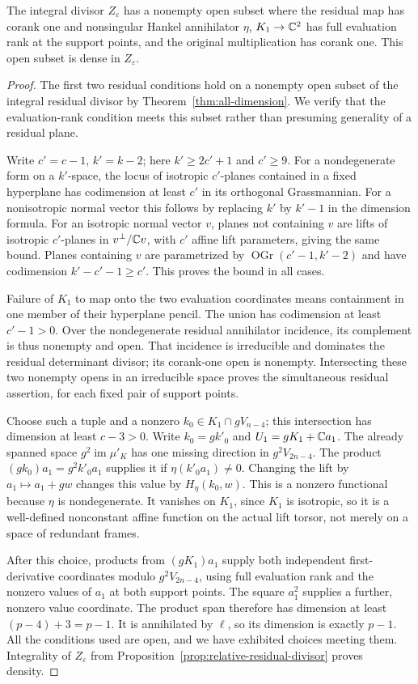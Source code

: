 \begin{lemma}
\label{lem:wall-open-nonempty}
The integral divisor $Z_\varepsilon$ has a nonempty open subset where
the residual map has corank one and nonsingular Hankel annihilator
$\eta$, $K_1\to\mathbb C^2$ has full evaluation rank at the support points,
and the original multiplication has corank one. This open subset is
dense in $Z_\varepsilon$.
\end{lemma}
\begin{proof}
The first two residual conditions hold on a nonempty open subset of
the integral residual divisor by Theorem~\ref{thm:all-dimension}.
We verify that the evaluation-rank condition meets this subset rather
than presuming generality of a residual plane.

Write $c'=c-1$, $k'=k-2$; here $k'\ge2c'+1$ and $c'\ge9$.
For a nondegenerate form on a $k'$-space, the locus of isotropic
$c'$-planes contained in a fixed hyperplane has codimension at least
$c'$ in its orthogonal Grassmannian. For a nonisotropic normal vector
this follows by replacing $k'$ by $k'-1$ in the dimension formula.
For an isotropic normal vector $v$, planes not containing $v$ are
lifts of isotropic $c'$-planes in $v^\perp/\mathbb C v$, with $c'$
affine lift parameters, giving the same bound. Planes containing $v$
are parametrized by $\operatorname{OGr}(c'-1,k'-2)$ and have
codimension $k'-c'-1\ge c'$. This proves the bound in all cases.

Failure of $K_1$ to map onto the two evaluation coordinates means
containment in one member of their hyperplane pencil. The union has
codimension at least $c'-1>0$. Over the nondegenerate residual
annihilator incidence, its complement is thus nonempty and open.
That incidence is irreducible and dominates the residual determinant
divisor; its corank-one open is nonempty. Intersecting these two
nonempty opens in an irreducible space proves the simultaneous
residual assertion, for each fixed pair of support points.

Choose such a tuple and a nonzero
$k_0\in K_1\cap gV_{n-4}$; this intersection has dimension at least
$c-3>0$. Write $k_0=gk'_0$ and $U_1=gK_1+\mathbb C a_1$.
The already spanned space $g^2\operatorname{im}\mu'_K$ has one
missing direction in $g^2V_{2n-4}$. The product
$(gk_0)a_1=g^2k'_0a_1$ supplies it if $\eta(k'_0a_1)\ne0$.
Changing the lift by $a_1\mapsto a_1+gw$ changes this value by
$H_\eta(k_0,w)$. This is a nonzero functional because $\eta$ is
nondegenerate. It vanishes on $K_1$, since $K_1$ is isotropic, so it
is a well-defined nonconstant affine function on the actual lift
torsor, not merely on a space of redundant frames.

After this choice, products from $(gK_1)a_1$ supply both independent
first-derivative coordinates modulo $g^2V_{2n-4}$, using full
evaluation rank and the nonzero values of $a_1$ at both support
points. The square $a_1^2$ supplies a further, nonzero value coordinate.
The product span therefore has dimension at least $(p-4)+3=p-1$.
It is annihilated by $\ell$, so its dimension is exactly $p-1$.
All the conditions used are open, and we have exhibited choices
meeting them. Integrality of $Z_\varepsilon$ from
Proposition~\ref{prop:relative-residual-divisor} proves density.
\end{proof}
